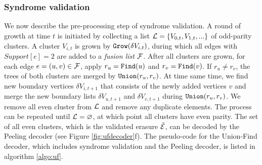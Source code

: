 \subsubsection{Syndrome validation}
We now describe the pre-processing step of syndrome validation. A round of growth at time $t$ is initiated by collecting a list $\mathcal{L} = \{V_{0,t}, V_{1,t}, ...\}$ of odd-parity clusters. A cluster $V_{i,t}$ is grown by $\texttt{Grow}(\delta V_{i,t})$, during which all edges with $Support[e]=2$ are added to a \emph{fusion list} $\mathcal{F}$. After all clusters are grown, for each edge $e=(u,v) \in \mathcal{F}$, apply $r_u=\texttt{Find}(u)$ and $r_v=\texttt{Find}(v)$. If $r_u\neq r_v$, the trees of both clusters are merged by $\texttt{Union}(r_u,r_v)$. At time same time, we find new boundary vertices $\delta V_{i,t+1}$ that consists of the newly added vertices $v$ and merge the new boundary lists $\delta V_{u,t+1}$ and $\delta V_{v,t+1}$ during $\texttt{Union}(r_u,r_v)$. We remove all even cluster from $\mathcal{L}$ and remove any duplicate elements. The process can be repeated until $\mathcal{L}=\varnothing$, at which point all clusters have even parity. The set of all even clusters, which is the validated erasure $\bar{\mathcal{E}}$, can be decoded by the Peeling decoder (see Figure \ref{fig:ufdecoder}f). The pseudo-code for the Union-Find decoder, which includes syndrome validation and the Peeling decoder, is listed in algorithm \ref{algo:uf}. 




